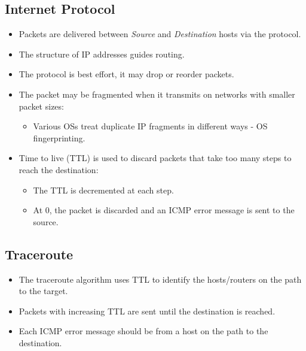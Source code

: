 \documentclass[11pt]{article}
\begin{document}
\subsection{Internet Protocol}
\begin{itemize}
  \item Packets are delivered between \textit{Source} and \textit{Destination} hosts via the protocol.
  \item The structure of IP addresses guides routing.
  \item The protocol is best effort, it may drop or reorder packets.
  \item The packet may be fragmented when it transmits on networks with smaller packet sizes:
    \begin{itemize}
      \item Various OSs treat duplicate IP fragments in different ways - OS fingerprinting.
    \end{itemize}
  \item Time to live (TTL) is used to discard packets that take too many steps to reach the destination:
    \begin{itemize}
      \item The TTL is decremented at each step.
      \item At 0, the packet is discarded and an ICMP error message is sent to the source.
    \end{itemize}
\end{itemize}

\subsection{Traceroute}
\begin{itemize}
  \item The traceroute algorithm uses TTL to identify the hosts/routers on the path to the target.
  \item Packets with increasing TTL are sent until the destination is reached.
  \item Each ICMP error message should be from a host on the path to the destination.
\end{itemize}
\end{document}
